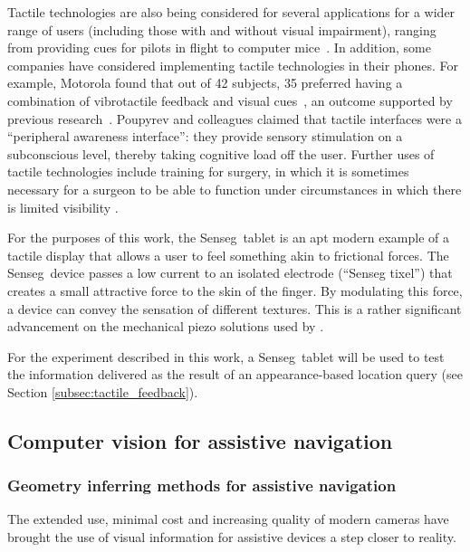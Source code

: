 Tactile technologies are also being considered for several applications for a wider range of users (including those with and without visual impairment), ranging from providing cues for pilots in flight \citep{spirkovska2005summary} to computer mice~\citep{akamatsu1996movement}. In addition, some companies have considered implementing tactile technologies in their phones. For example, Motorola found that out of 42 subjects, 35 preferred having a combination of vibrotactile feedback and visual cues~\citep{chang2005audio}, an outcome supported by previous research~\citep{poupyrev2002ambient}. Poupyrev and colleagues claimed that tactile interfaces were a ``peripheral awareness interface'': they provide sensory stimulation on a subconscious level, thereby taking cognitive load off the user. Further uses of tactile technologies include training for surgery, in which it is sometimes necessary for a surgeon to be able to function under circumstances in which there is limited visibility \citep{hu2006effectiveness}.

For the purposes of this work, the Senseg\texttrademark\ tablet is an apt modern example of a tactile display that allows a user to feel something akin to frictional forces. The Senseg\texttrademark\ device  passes a low current to an isolated electrode (``Senseg tixel'') that creates a small attractive force to the skin of the finger. By modulating this force, a device can convey the sensation of different textures. This is a rather significant advancement on the mechanical piezo solutions used by \citet{bliss1970optical}. 

For the experiment described in this work, a Senseg\texttrademark\ tablet will be used to test the information delivered as the result of an appearance-based location query (see Section \ref{subsec:tactile_feedback}).

\subsection{Computer vision for assistive navigation}

\subsubsection{Geometry inferring methods for assistive navigation}

The extended use, minimal cost and increasing quality of modern cameras have brought the use of visual information for assistive devices a step closer to reality. 

